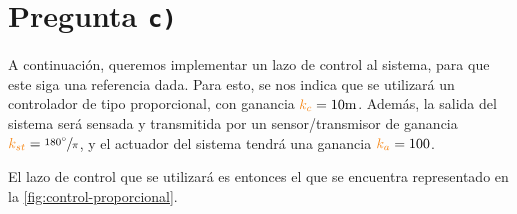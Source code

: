 \section{Pregunta \texttt{c)}}

A continuación, queremos implementar un lazo de control al sistema, para que
este siga una referencia dada. Para esto, se nos indica que se utilizará un
controlador de tipo proporcional, con ganancia $\nara{k_{c}} = 10\unit{m}$. Además, la
salida del sistema será sensada y transmitida por un sensor/transmisor
de ganancia $\nara{k_{st}} = \sfrac{\ang{180}}{\pi}$, y el actuador del sistema
tendrá una ganancia $\nara{k_{a}} = 100$.

El lazo de control que se utilizará es entonces el que se encuentra representado
en la \autoref{fig:control-proporcional}.

